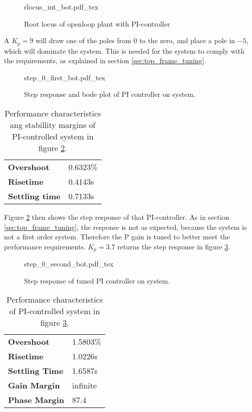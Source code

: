 \documentclass[../../../Main]{subfiles}
\begin{document}
\begin{figure}[H]
\centering
\def\svgwidth{\textwidth}
{rlocus_int_bot.pdf_tex}
\caption{Root locus of openloop plant with PI-controller}
\label{fig:rlocus_int_bot}
\end{figure}

A $K_p = 9$ will draw one of the poles from $0$ to the zero, and place a pole in $-5$, which will dominate the system. This is needed for the system to comply with the requirements, as explained in section \ref{sec:top_frame_tuning}.

\begin{figure}[H]
\centering
\def\svgwidth{\textwidth}
{step_0_first_bot.pdf_tex}
\caption{Step response and bode plot of PI controller on system.}
\label{fig:step_0_first_bot}
\end{figure}


\begin{table}[h]
	 \centering
	 \begin{tabular}{ll}
		 \textbf{Overshoot} & 0.6323\%\\
		 \textbf{Risetime}  & 0.4143s\\
		  \textbf{Settling time}& 0.7133s
	 \end{tabular}
	 \caption{Performance characteristics ang stabillity margins of PI-controlled system in figure \ref{fig:step_0_first_bot}.}
	 \label{tab:performance_0_5}
\end{table}



Figure \ref{fig:step_0_first_bot} then shows the step response of that PI-controller.
As in section \ref{sec:top_frame_tuning}, the response is not as expected, because the system is not a first order system. Therefore the P gain is tuned to better meet the performance requirements. $K_p = 3.7$ returns the step response in figure \ref{fig:step_0_second_bot}.

\begin{figure}[H]
\centering
\def\svgwidth{\textwidth}
{step_0_second_bot.pdf_tex}
\caption{Step response of tuned PI controller on system.}
\label{fig:step_0_second_bot}
\end{figure}


\begin{table}[h]
	 \centering
	 \begin{tabular}{ll}
		 \textbf{Overshoot} & 1.5803\%\\
		 \textbf{Risetime}  & 1.0226s\\
		 \textbf{Settling Time} & 1.6587s\\
	         \textbf{Gain Margin} & infinite\\
		 \textbf{Phase Margin} & 87.4\\
	 \end{tabular}
	 \caption{Performance characteristics of PI-controlled system in figure \ref{fig:step_0_second_bot}.}
	 \label{tab:performance_0_6}
\end{table}
\end{document}
